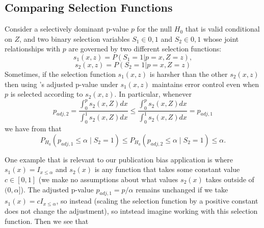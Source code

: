 \documentclass{article}
\begin{document}
\begin{appendix}
\subsection{Comparing Selection Functions}
\label{sec:publication_bias_appdx}

Consider a selectively dominant p-value $p$ for the null $H_0$ that is valid conditional on $Z$, and two binary selection variables $S_1 \in {0, 1}$ and $S_2 \in {0, 1}$ whose joint relationships with $p$ are governed by two different selection functions:
\begin{equation*}
    s_1(x, z) = P(S_1 = 1 | p=x, Z=z),
\end{equation*} 
\begin{equation*}
    s_2(x, z) = P(S_2 = 1 | p=x, Z=z)
\end{equation*} 
Sometimes, if the selection function $s_1(x, z)$ is harsher than the other $s_2(x, z)$ then using 's adjusted p-value under $s_1(x, z)$ maintains error control even when $p$ is selected according to $s_2(x, z)$. In particular, whenever
\begin{equation*}
    p_{adj, 2} =  \frac{\int_0^p s_2(x, Z) dx }{\int_0^1 s_2(x, Z) dx}  \leq \frac{\int_0^p s_2(x, Z) dx }{\int_0^1 s_2(x, Z) dx} = p_{adj, 1}
\end{equation*}
we have from  that 
\begin{equation*}
    P_{H_0}(p_{adj, 1}  \leq \alpha \mid S_2 = 1 ) \leq   P_{H_0}(p_{adj, 2}  \leq \alpha \mid S_2 = 1 )  \leq \alpha.
\end{equation*}

One example that is relevant to our publication bias application is where $s_1(x) = I_{x \leq \alpha}$ and $s_2(x)$ is any function that takes some constant value $c \in [0, 1]$ (we make no assumptions about what values $s_2(x)$ takes outside of $(0, \alpha]$). The adjusted p-value $p_{adj, 1} = p/\alpha$ remains unchanged if we take $s_1(x) = cI_{x \leq \alpha}$, so instead (scaling the selection function by a positive constant does not change the adjustment), so intstead imagine working with this selection function. Then we see that 


\end{appendix}
\end{document}
